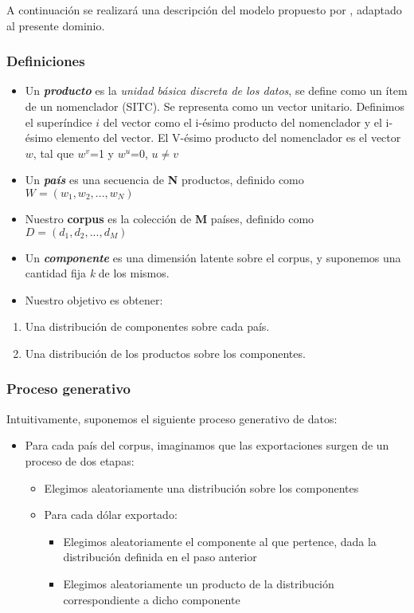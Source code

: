 \documentclass[class=article, crop=false]{standalone}
\begin{document}
A continuación se realizará una descripción del modelo propuesto por \cite{blei2003latent}, adaptado al presente dominio. 
	
\subsubsection{Definiciones}

\begin{itemize}
\item
Un \textbf{\emph{producto}} es la \emph{unidad básica discreta de los
	datos}, se define como un ítem de un nomenclador (SITC). Se representa
como un vector unitario. Definimos el superíndice \(i\) del vector
como el i-ésimo producto del nomenclador y el i-ésimo elemento del
vector. El V-ésimo producto del nomenclador es el vector \(w\), tal
que \(w^v\)=1 y \(w^u\)=0, \(u\neq v\)
\item
Un \textbf{\emph{país}} es una secuencia de \textbf{N} productos,
definido como \(W= (w_1, w_2, ..., w_N)\)
\item
Nuestro \textbf{corpus} es la colección de \textbf{M} países, definido
como \(D = (d_1, d_2,..., d_M)\)
\item
Un \textbf{\emph{componente}} es una dimensión latente sobre el
corpus, y suponemos una cantidad fija \emph{k} de los mismos.
\item
Nuestro objetivo es obtener:
\end{itemize}

\begin{enumerate}
\def\labelenumi{\arabic{enumi}.}
\item
Una distribución de componentes sobre cada país.
\item
Una distribución de los productos sobre los componentes.
\end{enumerate}


\subsubsection{Proceso generativo}

Intuitivamente, suponemos el siguiente proceso generativo de datos:

\begin{itemize}
\item
Para cada país del corpus, imaginamos que las exportaciones surgen de
un proceso de dos etapas:

\begin{itemize}
	\item
	Elegimos aleatoriamente una distribución sobre los componentes
	\item
	Para cada dólar exportado:
	
	\begin{itemize}
		\item
		Elegimos aleatoriamente el componente al que pertence, dada la
		distribución definida en el paso anterior
		\item
		Elegimos aleatoriamente un producto de la distribución
		correspondiente a dicho componente
	\end{itemize}
\end{itemize}
\end{itemize}
\end{document}
